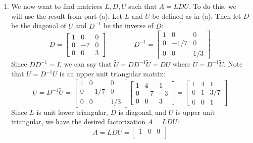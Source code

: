 \documentclass[11pt]{article}
\begin{document}
\begin{exercise}{3}
{\begin{enumerate}[label=(\alph*)]
$$\begin{bmatrix}
                0 & 0 & 3
            \end{bmatrix}
            $$
            \item We now want to find matrices $L, D, U$ such that $A = LDU$.
            To do this, we will use the result from part (a).
            Let $L$ and $\tilde{U}$ be defined as in (a).
            Then let $D$ be the diagonal of $\tilde{U}$ and $D^{-1}$ be the inverse of $D$:
            $$ D =
            \begin{bmatrix}
                1 & 0 & 0 \\
                0 & -7 & 0 \\
                0 & 0 & 3
            \end{bmatrix}
            \hspace{4em}
            D^{-1} =
            \begin{bmatrix}
                1 & 0 & 0 \\
                0 & -1/7 & 0 \\
                0 & 0 & 1/3
            \end{bmatrix} $$
            Since $DD^{-1} = I$, we can say that $\tilde{U} = D D^{-1} \tilde{U} = D U$ where $U = D^{-1} \tilde{U}$.
            Note that $U = D^{-1} U$ is an upper unit triangular matrix:
            $$ U = D^{-1} \tilde{U} =
            \begin{bmatrix}
                1 & 0 & 0 \\
                0 & -1/7 & 0 \\
                0 & 0 & 1/3
            \end{bmatrix}
            \begin{bmatrix}
                1 & 4 & 1 \\
                0 & -7 & -3 \\
                0 & 0 & 3
            \end{bmatrix}
            =
            \begin{bmatrix}
                1 & 4 & 1 \\
                0 & 1 & 3/7 \\
                0 & 0 & 1
            \end{bmatrix}
            $$
            Since $L$ is unit lower triangular, $D$ is diagonal, and $U$ is upper unit triangular, we have the desired factorization $A = LDU$:
            $$ A = LDU =
            \begin{bmatrix}
                1 & 0 & 0 \\

\end{bmatrix}$$
\end{enumerate}}
\end{exercise}
\end{document}
